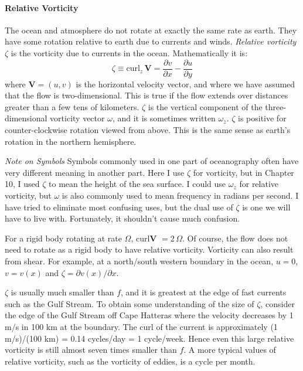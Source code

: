 \paragraph{Relative Vorticity}
The ocean and atmosphere do not rotate at exactly the same rate as earth. They have some
rotation relative to earth due to currents and winds. \textit{Relative vorticity} $\zeta$ is the vorticity due to currents in the ocean. Mathematically it is:
\begin{equation}
\boxed{ \zeta \equiv \text{curl}_z\, \textbf{V} =
\frac{\partial{v}}{\partial{x}}-\frac{\partial{u}}{\partial{y}} }
\end{equation}
where $\textbf{V} = (u, v)$ is the horizontal velocity vector, and where we have
assumed that the flow is two-dimensional. This is true if the flow extends over
distances greater than a few tens of kilometers. $\zeta $ is the vertical
component of the three-dimensional vorticity vector $\omega$, and it is sometimes
written
$\omega{_z}$. $\zeta$ is positive for counter-clockwise rotation viewed from
above. This is the same sense as earth's rotation in the northern hemisphere.

\textit{Note on Symbols} Symbols commonly used in one part of oceanography
often have very different meaning in another part. Here I use $\zeta$ for
vorticity, but in Chapter 10, I used $\zeta$ to mean the height of the sea
surface. I could use $\omega_z$ for relative vorticity, but $\omega$ is also
commonly used to mean frequency in radians per second. I have tried to
eliminate most confusing uses, but the dual use of $\zeta$ is one we will
have to live with. Fortunately, it shouldn't cause much confusion.

For a rigid body rotating at rate $\Omega$, curl\textbf{V} $= 2\,\Omega$. Of
course, the flow does not need to rotate as a rigid body to have relative
vorticity. Vorticity can also result from shear. For example, at a north/south
western boundary in the ocean,
$u=0$, $v=v(x)$ and $\zeta = \partial{v(x)}/\partial{x}$.

$\zeta$ is usually much smaller than $f$, and it is greatest at the edge of fast
currents such as the Gulf Stream. To obtain some understanding of
the size of $\zeta$, consider the edge of the Gulf Stream off Cape Hatteras where
the velocity decreases by 1 m/s in 100 km at the boundary. The curl of the current
is approximately (1 m/s)/(100 km) = 0.14 cycles/day = 1 cycle/week. Hence even
this large relative vorticity is still almost seven times smaller than $f$. A more
typical values of relative vorticity, such as the vorticity of eddies, is a
cycle per month.

